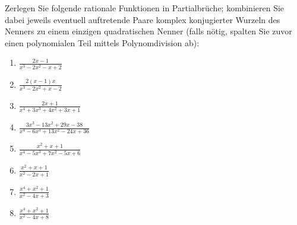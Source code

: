 
Zerlegen Sie folgende rationale Funktionen in Partialbrüche; kombinieren Sie dabei jeweils eventuell auftretende Paare komplex konjugierter Wurzeln des Nenners zu einem einzigen quadratischen Nenner (falls nötig, spalten Sie zuvor einen polynomialen Teil mittels Polynomdivision ab):\\
\parbox{0.5\textwidth}{\begin{enumerate}
\item $\frac{2 x-1}{x^3-2 x^2-x+2}$
\item $\frac{2 (x-1) x}{x^3-2 x^2+x-2}$
\item $\frac{2x+1}{x^4+3x^3+4x^2+3x+1}$
\item $\frac{3 x^3-13 x^2+29 x-38}{x^4-6 x^3+13 x^2-24 x+36}$
\end{enumerate}}\parbox{0.5\textwidth}{\begin{enumerate}\setcounter{enumi}{4}
\item $\frac{x^2+x+1}{x^4-5 x^3+7 x^2-5 x+6}$
\item $\frac{x^2+x+1}{x^2 - 2 x + 1}$
\item $\frac{x^4 + x^2 + 1}{x^2 - 4 x + 3}$
\item $\frac{x^4 + x^2 + 1}{x^2 - 4 x + 8}$
\end{enumerate}}


